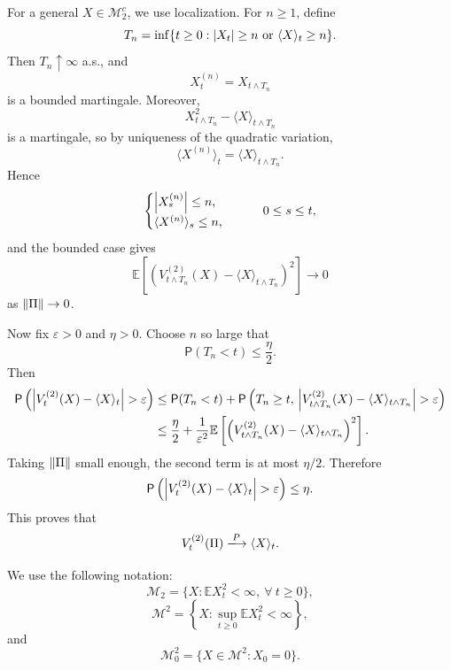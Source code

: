 {    For a general $X \in \mathcal{M}_2^c$, we use localization. For $n \geq 1$, define
    $$
        T_n = \inf \{ t \geq 0 : \left| X_t \right| \geq n \text{ or } \langle X \rangle_t \geq n \}.
    $$
    Then $T_n \uparrow \infty$ a.s., and
    $$
        X_t^{(n)} = X_{t \wedge T_n}
    $$
    is a bounded martingale. Moreover,
    $$
        X_{t \wedge T_n}^2 - \langle X \rangle_{t \wedge T_n}
    $$
    is a martingale, so by uniqueness of the quadratic variation,
    $$
        \langle X^{(n)} \rangle_t = \langle X \rangle_{t \wedge T_n}.
    $$
    Hence
    $$
    \begin{cases}
        \left| X_s^{(n)} \right| \leq n, \\
        \langle X^{(n)} \rangle_s \leq n,
    \end{cases}
    \qquad 0 \leq s \leq t,
    $$
    and the bounded case gives
    $$
        \mathbb{E}\left[
            \left(
                V_{t \wedge T_n}^{(2)}(X) - \langle X \rangle_{t \wedge T_n}
            \right)^2
        \right] \to 0
    $$
    as $\left\| \Pi \right\| \to 0$.

    Now fix $\varepsilon > 0$ and $\eta > 0$. Choose $n$ so large that
    $$
        \mathsf{P}(T_n < t) \leq \frac{\eta}{2}.
    $$
    Then
    $$
    \begin{aligned}
        \mathsf{P}\left( \left| V_t^{(2)}(X) - \langle X \rangle_t \right| > \varepsilon \right)
        &\leq
        \mathsf{P}(T_n < t)
        + \mathsf{P}\left(
            T_n \geq t,\,
            \left| V_{t \wedge T_n}^{(2)}(X) - \langle X \rangle_{t \wedge T_n} \right| > \varepsilon
        \right) \\
        &\leq
        \frac{\eta}{2}
        + \frac{1}{\varepsilon^2}
        \mathbb{E}\left[
            \left(
                V_{t \wedge T_n}^{(2)}(X) - \langle X \rangle_{t \wedge T_n}
            \right)^2
        \right].
    \end{aligned}
    $$
    Taking $\left\| \Pi \right\|$ small enough, the second term is at most $\eta/2$. Therefore
    $$
        \mathsf{P}\left( \left| V_t^{(2)}(X) - \langle X \rangle_t \right| > \varepsilon \right) \leq \eta.
    $$
    This proves that
    $$
        V_t^{(2)}(\Pi) \xlongrightarrow{P} \langle X \rangle_t.
    $$
}


We use the following notation:
$$
    \mathcal{M}_2 = \{X : \mathbb{E}X_t^2 < \infty,\ \forall~ t \geq 0\},
$$
$$
    \mathcal{M}^2 = \left\{X : \sup_{t \geq 0} \mathbb{E}X_t^2 < \infty\right\},
$$
and
$$
    \mathcal{M}_0^2 = \{X \in \mathcal{M}^2 : X_0 = 0\}.
$$
